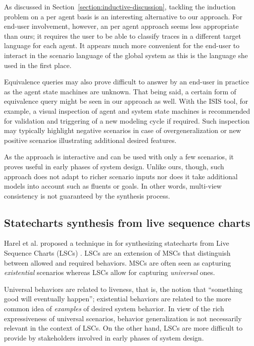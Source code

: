 As discussed in Section~\ref{section:inductive-discussion}, tackling the induction problem on a per agent basis is an interesting alternative to our approach. For end-user involvement, however, an per agent approach seems less appropriate than ours; it requires the user to be able to classify traces in a different target language for each agent. It appears much more convenient for the end-user to interact in the scenario language of the global system as this is the language she used in the first place.

Equivalence queries may also prove difficult to answer by an end-user in practice as the agent state machines are unknown. That being said, a certain form of equivalence query might be seen in our approach as well. With the ISIS tool, for example, a visual inspection of agent and system state machines is recommended for validation and triggering of a new modeling cycle if required. Such inspection may typically highlight negative scenarios in case of overgeneralization or new positive scenarios illustrating additional desired features.

As the approach is interactive and can be used with only a few scenarios, it proves useful in early phases of system design. Unlike ours, though, such approach does not adapt to richer scenario inputs nor does it take additional models into account such as fluents or goals. In other words, multi-view consistency is not guaranteed by the synthesis process.


\subsection{Statecharts synthesis from live sequence charts}

Harel et al. proposed a technique in \cite{Harel:2005} for synthesizing statecharts from Live Sequence Charts (LSCs) \cite{Damm:2001}. LSCs are an extension of MSCs that distinguish between allowed and required behaviors. MSCs are often seen as capturing \emph{existential} scenarios whereas LSCs allow for capturing \emph{universal} ones. 

Universal behaviors are related to liveness, that is, the notion that ``something good will eventually happen''; existential behaviors are related to the more common idea of \emph{examples} of desired system behavior. In view of the rich expressiveness of universal scenarios, behavior generalization is not necessarily relevant in the context of LSCs. On the other hand, LSCs are more difficult to provide by stakeholders involved in early phases of system design. 

